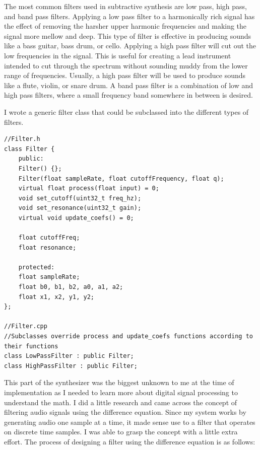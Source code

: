 \documentclass[acmlarge,screen]{acmart}
\begin{document}
The most common filters used in subtractive synthesis are low pass, high pass, and band pass filters. Applying a low pass filter to a harmonically rich signal has the effect of removing the harsher upper harmonic frequencies and making the signal more mellow and deep. This type of filter is effective in producing sounds like a bass guitar, bass drum, or cello. Applying a high pass filter will cut out the low frequencies in the signal. This is useful for creating a lead instrument intended to cut through the spectrum without sounding muddy from the lower range of frequencies. Usually, a high pass filter will be used to produce sounds like a flute, violin, or snare drum. A band pass filter is a combination of low and high pass filters, where a small frequency band somewhere in between is desired.

I wrote a generic filter class that could be subclassed into the different types of filters.
\begin{lstlisting}
//Filter.h
class Filter {
	public:
	Filter() {};
	Filter(float sampleRate, float cutoffFrequency, float q);
	virtual float process(float input) = 0;
	void set_cutoff(uint32_t freq_hz);
	void set_resonance(uint32_t gain);
	virtual void update_coefs() = 0;
	
	float cutoffFreq;
	float resonance;
	
	protected:
	float sampleRate;
	float b0, b1, b2, a0, a1, a2;
	float x1, x2, y1, y2;
};

//Filter.cpp
//Subclasses override process and update_coefs functions according to their functions
class LowPassFilter : public Filter;
class HighPassFilter : public Filter;
\end{lstlisting}

This part of the synthesizer was the biggest unknown to me at the time of implementation as I needed to learn more about digital signal processing to understand the math. I did a little research and came across the concept of filtering audio signals using the difference equation. Since my system works by generating audio one sample at a time, it made sense use to a filter that operates on discrete time samples. I was able to grasp the concept with a little extra effort. The process of designing a filter using the difference equation is as follows:
\end{document}
